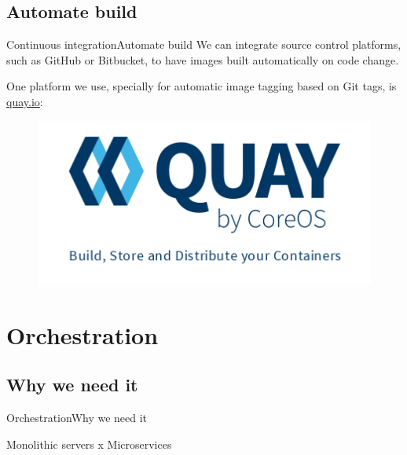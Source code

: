 \documentclass[10pt]{beamer}
\begin{document}
\subsection{Automate build}
\begin{frame}{Continuous integration}{Automate build}
	We can integrate source control platforms, such as GitHub or Bitbucket, to have images built automatically on code change.
	
	\vspace{0.5cm}
		
	One platform we use, specially for automatic image tagging based on Git tags, is \url{quay.io}:
	\begin{figure}[h!]
		\centering
		\includegraphics[width=.75\textwidth]{images/quay_preview.png}
	\end{figure}
\end{frame}

\section{Orchestration}
\subsection{Why we need it}
\begin{frame}{Orchestration}{Why we need it}
	\begin{center}
		Monolithic servers x Microservices
	\end{center}
\end{frame}
\end{document}
